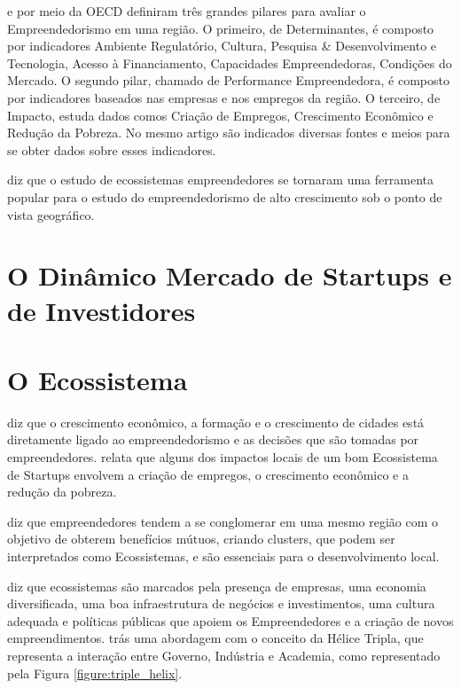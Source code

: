  e  por meio da OECD definiram três grandes pilares para avaliar o Empreendedorismo em uma região. O primeiro, de Determinantes, é composto por indicadores Ambiente Regulatório, Cultura, Pesquisa \& Desenvolvimento e Tecnologia, Acesso à Financiamento, Capacidades Empreendedoras, Condições do Mercado. O segundo pilar, chamado de Performance Empreendedora, é composto por indicadores baseados nas empresas e nos empregos da região. O terceiro, de Impacto, estuda dados comos Criação de Empregos, Crescimento Econômico e Redução da Pobreza. No mesmo artigo são indicados diversas fontes e meios para se obter dados sobre esses indicadores.



 diz que o estudo de ecossistemas empreendedores se tornaram uma ferramenta popular para o estudo do empreendedorismo de alto crescimento sob o ponto de vista geográfico. 

\section{O Dinâmico Mercado de Startups e de Investidores}
\label{section:o_dinamico_mercado_das_startups}

\section{O Ecossistema}
\label{section:ecossistemas_e_suas_pecas}

 diz que o crescimento econômico, a formação e o crescimento de cidades está diretamente ligado ao empreendedorismo e as decisões que são tomadas por empreendedores.  relata que alguns dos impactos locais de um bom Ecossistema de Startups envolvem a criação de empregos, o crescimento econômico e a redução da pobreza. 

 diz que empreendedores tendem a se conglomerar em uma mesmo região com o objetivo de obterem benefícios mútuos, criando clusters, que podem ser interpretados como Ecossistemas, e são essenciais para o desenvolvimento local.

 diz que ecossistemas são marcados pela presença de empresas, uma economia diversificada, uma boa infraestrutura de negócios e investimentos, uma cultura adequada e políticas públicas que apoiem os Empreendedores e a criação de novos empreendimentos.  trás uma abordagem com o conceito da Hélice Tripla, que representa a interação entre Governo, Indústria e Academia, como representado pela Figura \ref{figure:triple_helix}. 

